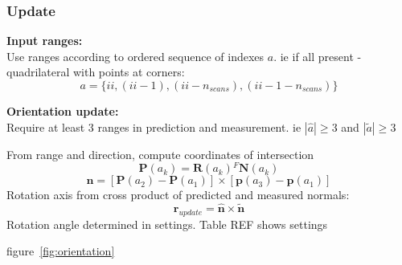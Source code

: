 	\subsubsection{Update}
		\textbf{Input ranges:}\\
			Use ranges according to ordered sequence of indexes $a$. ie if all present - quadrilateral with points at corners:
			\begin{equation}
				a = \{ii,(ii-1),(ii-n_{scans}),(ii-1-n_{scans})\}
			\end{equation}
		
		\textbf{Orientation update:}\\
			Require at least 3 ranges in prediction and measurement. ie
			$|\hat{a}| \geq 3$ and $|\tilde{a}| \geq 3$
	
			From range and direction, compute coordinates of intersection\\
			\begin{equation}
				\mathbf{P}(a_k) = \mathbf{R}(a_k){^{F}\mathbf{N}(a_k)}
			\end{equation}
			\begin{equation}
				\mathbf{n} = [\mathbf{P}(a_2) - \mathbf{P}(a_1)] \times [\mathbf{p}(a_3) - \mathbf{p}(a_1)]
			\end{equation}
			Rotation axis from cross product of predicted and measured normals:\\
			\begin{equation}
				\mathbf{r}_{update} = \hat{\mathbf{n}} \times \tilde{\mathbf{n}}
			\end{equation}
			Rotation angle determined in settings. Table REF shows settings	
			
			figure~\ref{fig:orientation}
			
			
